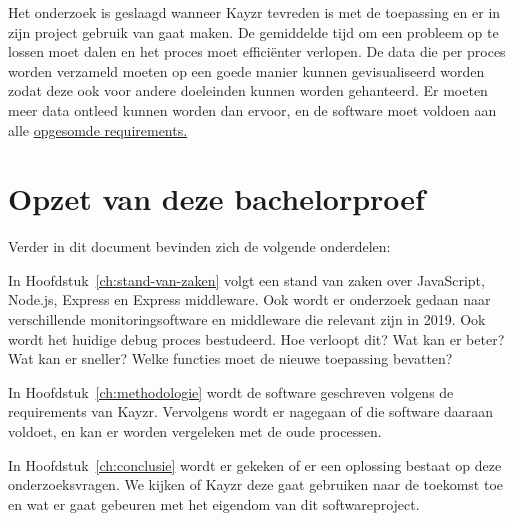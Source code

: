 Het onderzoek is geslaagd wanneer Kayzr tevreden is met de toepassing en er in zijn project gebruik van gaat maken. De gemiddelde tijd om een probleem op te lossen moet dalen en het proces moet efficiënter verlopen. De data die per proces worden verzameld moeten op een goede manier kunnen gevisualiseerd worden zodat deze ook voor andere doeleinden kunnen worden gehanteerd. Er moeten meer data ontleed kunnen worden dan ervoor, en de software moet voldoen aan alle \hyperref[sec:requirements]{opgesomde requirements.}


\section{Opzet van deze bachelorproef}
\label{sec:opzet-bachelorproef}


Verder in dit document bevinden zich de volgende onderdelen:

In Hoofdstuk~\ref{ch:stand-van-zaken} volgt een stand van zaken over JavaScript, Node.js, Express en Express middleware. Ook wordt er onderzoek gedaan naar verschillende monitoringsoftware en middleware die relevant zijn in 2019. Ook wordt het huidige debug proces bestudeerd. Hoe verloopt dit? Wat kan er beter? Wat kan er sneller? Welke functies moet de nieuwe toepassing bevatten?

In Hoofdstuk~\ref{ch:methodologie} wordt de software geschreven volgens de requirements van Kayzr. Vervolgens wordt er nagegaan of die software daaraan voldoet, en kan er worden vergeleken met de oude processen.


In Hoofdstuk~\ref{ch:conclusie} wordt er gekeken of er een oplossing bestaat op deze onderzoeksvragen. We kijken of Kayzr deze gaat gebruiken naar de toekomst toe en wat er gaat gebeuren met het eigendom van dit softwareproject.

